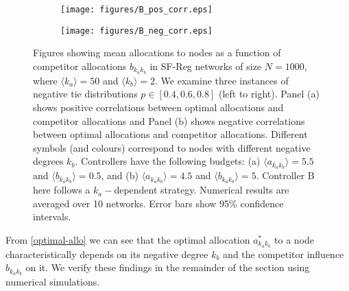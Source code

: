 \begin{figure}
  \begin{subfigure}[b]{\textwidth}
  \centering
    \texttt{[image: figures/B\_pos\_corr.eps]}
    \caption{}
    \label{Ana-num-1}
  \end{subfigure}
  
    \begin{subfigure}[b]{\textwidth}
    \texttt{[image: figures/B\_neg\_corr.eps]}
    \caption{}
    \label{Ana-num-2}
  \end{subfigure}
  \caption{Figures showing mean allocations to nodes as a function of competitor allocations $b_{k_{a}k_{b}}$ in SF-Reg networks of size $N=1000$, where $\langle k_{a} \rangle = 50$ and $\langle k_{b} \rangle = 2$. We examine three instances of negative tie distributions $p \in [0.4,0.6,0.8]$ (left to right). Panel (a) shows positive correlations between optimal allocations and competitor allocations and Panel (b) shows negative correlations between optimal allocations and competitor allocations. Different symbols (and colours) correspond to nodes with different negative degrees $k_{b}$. Controllers have the following budgets: (a) $\langle a_{k_{a}k_{b}} \rangle = 5.5$ and $\langle b_{k_{a}k_{b}} \rangle = 0.5$, and (b) $\langle a_{k_{a}k_{b}} \rangle = 4.5$ and $\langle b_{k_{a}k_{b}} \rangle = 5$. Controller B here follows a $k_{a}-$dependent strategy. Numerical results are averaged over 10 networks. Error bars show 95\% confidence intervals.}
  \label{Ana-num-b}
  \end{figure}



From \cref{optimal-allo} we can see that the optimal allocation $a_{k_{a}k_{b}}^*$ to a node characteristically depends on its negative degree $k_{b}$ and the competitor influence $b_{k_{a}k_{b}}$ on it. We verify these findings in the remainder of the section using numerical simulations.  

